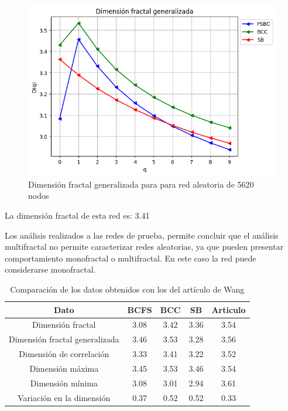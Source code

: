 \begin{figure}[H]
    \centering
    \includegraphics[scale=0.7]{Capitulo4Multifractalidad/imagenes/a_Dqrandom5620.png}
    \caption{Dimensión fractal generalizada para para red aleatoria de 5620 nodos}
\end{figure}

La dimensión fractal de esta red es: 3.41

Los análisis realizados a las redes de prueba, permite concluir que el análisis multifractal no permite caracterizar redes aleatorias, ya que pueden presentar comportamiento monofractal o multifractal. En este caso la red puede considerarse monofractal.

\begin{table}[H]
    \centering
    \begin{tabular}{|c|c|c|c|c|}
        \hline
         \textbf{Dato}& \textbf{BCFS} & \textbf{BCC} & \textbf{SB} & \textbf{Articulo} \\
         \hline
         Dimensión fractal & 3.08 & 3.42 & 3.36 & 3.54\\
         \hline
         Dimensión fractal generalizada  & 3.46 & 3.53 & 3.28 & 3.56 \\
         \hline
         Dimensión de correlación & 3.33 & 3.41  & 3.22 &3.52 \\
         \hline
         Dimensión máxima & 3.45 & 3.53 & 3.46 & 3.54\\
         \hline
         Dimensión mínima & 3.08 & 3.01 & 2.94 & 3.61\\
         \hline
         Variación en la dimensión & 0.37 &  0.52 & 0.52 & 0.33 \\
         \hline
    \end{tabular}
    \caption{Comparación de los datos obtenidos con los del artículo de Wang\cite{Wang2012}}
\end{table}


